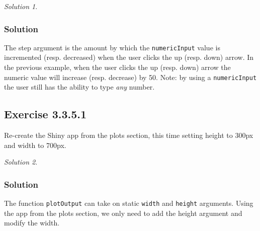 \documentclass[
]{book}
\newenvironment{Shaded}{\begin{snugshade}}{\end{snugshade}}
\newcommand{\AttributeTok}[1]{\textcolor[rgb]{0.77,0.63,0.00}{#1}}
\newcommand{\ControlFlowTok}[1]{\textcolor[rgb]{0.13,0.29,0.53}{\textbf{#1}}}
\newcommand{\DecValTok}[1]{\textcolor[rgb]{0.00,0.00,0.81}{#1}}
\newcommand{\FunctionTok}[1]{\textcolor[rgb]{0.00,0.00,0.00}{#1}}
\newcommand{\NormalTok}[1]{#1}
\newcommand{\OtherTok}[1]{\textcolor[rgb]{0.56,0.35,0.01}{#1}}
\newcommand{\SpecialCharTok}[1]{\textcolor[rgb]{0.00,0.00,0.00}{#1}}
\newcommand{\StringTok}[1]{\textcolor[rgb]{0.31,0.60,0.02}{#1}}
\theoremstyle{definition}
\theoremstyle{definition}
\theoremstyle{definition}
\theoremstyle{definition}
\theoremstyle{remark}
\newtheorem*{solution}{Solution}
\begin{document}
\begin{solution}
\leavevmode

\hypertarget{solution-9}{%
\subsubsection*{Solution}\label{solution-9}}

The step argument is the amount by which the \texttt{numericInput} value is
incremented (resp. decreased) when the user clicks the up (resp. down) arrow.
In the previous example, when the user clicks the up (resp. down) arrow the
numeric value will increase (resp. decrease) by 50. Note: by using a
\texttt{numericInput} the user still has the ability to type \emph{any} number.

\end{solution}

\hypertarget{exercise-3.3.5.1}{%
\subsection*{Exercise 3.3.5.1}\label{exercise-3.3.5.1}}

Re-create the Shiny app from the plots section, this time setting height to
300px and width to 700px.

\begin{solution}
\leavevmode

\hypertarget{solution-10}{%
\subsubsection*{Solution}\label{solution-10}}

The function \texttt{plotOutput} can take on static \texttt{width} and \texttt{height} arguments.
Using the app from the plots section, we only need to add the height argument
and modify the width.

\begin{Shaded}
\end{Shaded}

\end{solution}
\end{document}
